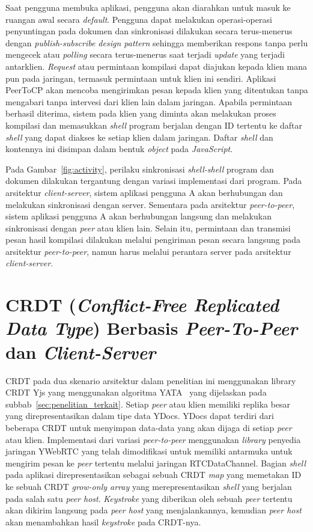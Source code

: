 Saat pengguna membuka aplikasi, pengguna akan diarahkan untuk masuk ke ruangan awal secara \textit{default}. Pengguna dapat melakukan operasi-operasi penyuntingan pada dokumen dan sinkronisasi dilakukan secara terus-menerus dengan \textit{publish-subscribe design pattern} sehingga memberikan respons tanpa perlu mengecek atau \textit{polling} secara terus-menerus saat terjadi \textit{update} yang terjadi antarklien. \textit{Request} atau permintaan kompilasi dapat diajukan kepada klien mana pun pada jaringan, termasuk permintaan untuk klien ini sendiri. Aplikasi PeerToCP akan mencoba mengirimkan pesan kepada klien yang ditentukan tanpa mengabari tanpa intervesi dari klien lain dalam jaringan. Apabila permintaan berhasil diterima, sistem pada klien yang diminta akan melakukan proses kompilasi dan memasukkan \textit{shell} program berjalan dengan ID tertentu ke daftar \textit{shell} yang dapat diakses ke setiap klien dalam jaringan. Daftar \textit{shell} dan kontennya ini disimpan dalam bentuk \textit{object} pada \textit{JavaScript}.

Pada Gambar~\ref{fig:activity}, perilaku sinkronisasi \textit{shell-shell} program dan dokumen dilakukan tergantung dengan variasi implementasi dari program. Pada arsitektur \textit{client-server}, sistem aplikasi pengguna A akan berhubungan dan melakukan sinkronisasi dengan server. Sementara pada arsitektur \textit{peer-to-peer}, sistem aplikasi pengguna A akan berhubungan langsung dan melakukan sinkronisasi dengan \textit{peer} atau klien lain. Selain itu, permintaan dan transmisi pesan hasil kompilasi dilakukan melalui pengiriman pesan secara langsung pada arsitektur \textit{peer-to-peer}, namun harus melalui perantara server pada arsitektur \textit{client-server}.


\section{CRDT (\textit{Conflict-Free Replicated Data Type}) Berbasis \textit{Peer-To-Peer} dan \textit{Client-Server}}
\label{sec:desain_crdt}

CRDT pada dua skenario arsitektur dalam penelitian ini menggunakan library CRDT Yjs yang menggunakan algoritma YATA~\citep{Nicolaescu2016yjs} yang dijelaskan pada subbab~\ref{sec:penelitian_terkait}. Setiap \textit{peer} atau klien memiliki replika besar yang direpresentasikan dalam tipe data YDocs. YDocs dapat terdiri dari beberapa CRDT untuk menyimpan data-data yang akan dijaga di setiap \textit{peer} atau klien. Implementasi dari variasi \textit{peer-to-peer} menggunakan \textit{library} penyedia jaringan YWebRTC yang telah dimodifikasi untuk memiliki antarmuka untuk mengirim pesan ke \textit{peer} tertentu melalui jaringan RTCDataChannel. Bagian \textit{shell} pada aplikasi direpresentasikan sebagai sebuah CRDT \textit{map} yang memetakan ID ke sebuah CRDT \textit{grow-only array} yang merepresentasikan \textit{shell} yang berjalan pada salah satu \textit{peer host}. \textit{Keystroke} yang diberikan oleh sebuah \textit{peer} tertentu akan dikirim langsung pada \textit{peer host} yang menjalankannya, kemudian \textit{peer host} akan menambahkan hasil \textit{keystroke} pada CRDT-nya.

